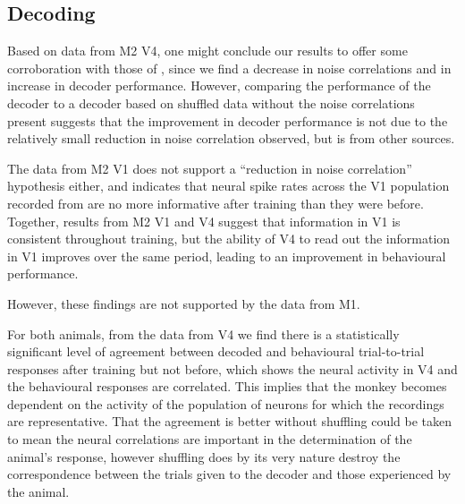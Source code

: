 % 

\subsection{Decoding}

Based on data from \ac{M2} \ac{V4}, one might conclude our results to offer some corroboration with those of \citet{Gu2011}, since we find a decrease in noise correlations and in increase in decoder performance.
However, comparing the performance of the decoder to a decoder based on shuffled data without the noise correlations present suggests that the improvement in decoder performance is not due to the relatively small reduction in noise correlation observed, but is from other sources.

The data from \ac{M2} \ac{V1} does not support a ``reduction in noise correlation'' hypothesis either, and indicates that neural spike rates across the \ac{V1} population recorded from are no more informative after training than they were before.
Together, results from \ac{M2} \ac{V1} and \ac{V4} suggest that information in \ac{V1} is consistent throughout training, but the ability of \ac{V4} to read out the information in \ac{V1} improves over the same period, leading to an improvement in behavioural performance.

However, these findings are not supported by the data from \ac{M1}.


For both animals, from the data from \ac{V4} we find there is a statistically significant level of agreement between decoded and behavioural trial-to-trial responses after training but not before, which shows the neural activity in \ac{V4} and the behavioural responses are correlated.
This implies that the monkey becomes dependent on the activity of the population of neurons for which the recordings are representative.
That the agreement is better without shuffling could be taken to mean the neural correlations are important in the determination of the animal's response, however shuffling does by its very nature destroy the correspondence between the trials given to the decoder and those experienced by the animal.

